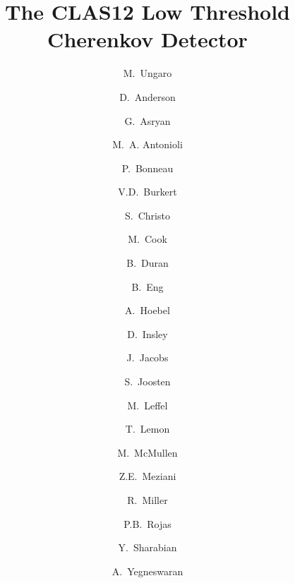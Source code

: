 \title{The CLAS12 Low Threshold Cherenkov Detector}


\author[JLAB]{M.~Ungaro}
\author[A]{D.~Anderson}      %
\author[A]{G.~Asryan}        %
\author[A]{M.~A. Antonioli}  %
\author[A]{P.~Bonneau}       %
\author[A]{V.D.~Burkert}     %
\author[A]{S.~Christo}       %
\author[A]{M.~Cook}          %
\author[TEMPLE]{B.~Duran}    %
\author[A]{B.~Eng}           %
\author[A]{A.~Hoebel}        %
\author[A]{D.~Insley}        %
\author[A]{J.~Jacobs}        %
\author[ARGONNE]{S.~Joosten} %
\author[A]{M.~Leffel}        %
\author[A]{T.~Lemon}         %
\author[A]{M.~McMullen}      %
\author[B,C]{Z.E.~Meziani}   %
\author[A]{R.~Miller}        %
\author[A]{P.B.~Rojas}       %
\author[JLAB]{Y.~Sharabian}  %
\author[A]{A.~Yegneswaran}   %


\address[JLAB]{Thomas Jefferson National Accelerator Facility, Newport News, VA 23606, USA}
\address[TEMPLE]{Temple University, Philadelphia, PA 19122, USA}
\address[ARGONNE]{Argonne National Laboratory, Lemont, IL 60439, USA}
